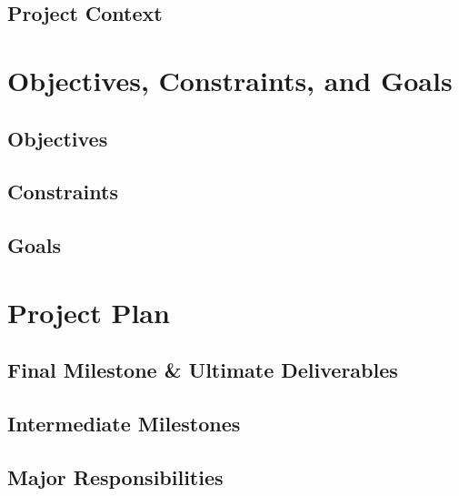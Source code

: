 \documentclass[10pt,letterpaper]{article}
\begin{document}
\subsection{Project Context}


\section{Objectives, Constraints, and Goals}


\subsection{Objectives}


\subsection{Constraints}


\subsection{Goals}


\section{Project Plan}


\subsection{Final Milestone \& Ultimate Deliverables}\label{final_milestone}


\subsection{Intermediate Milestones}\label{intermediate_milestone}


\subsection{Major Responsibilities}


% 
\end{document}

